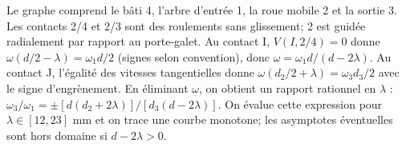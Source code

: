 \begin{corrigebox}
Le graphe comprend le bâti 4, l'arbre d'entrée 1, la roue mobile 2 et
                la sortie 3. Les contacts 2/4 et 2/3 sont des roulements sans glissement;
                2 est guidée radialement par rapport au porte-galet.
Au contact I, $V(I,2/4)=0$ donne
                $\omega(d/2-\lambda)=\omega_1 d/2$ (signes selon convention), donc
                $\omega=\omega_1 d/(d-2\lambda)$.
Au contact J, l'égalité des vitesses tangentielles donne
                $\omega(d_2/2+\lambda)=\omega_3d_3/2$ avec le signe d'engrènement.
En éliminant $\omega$, on obtient un rapport rationnel en $\lambda$ :
                $\omega_3/\omega_1=\pm[d(d_2+2\lambda)]/[d_3(d-2\lambda)]$.
On évalue cette expression pour $\lambda\in[12,23]$ mm et on trace
                une courbe monotone; les asymptotes éventuelles sont hors domaine si
                $d-2\lambda>0$.
\end{corrigebox}
